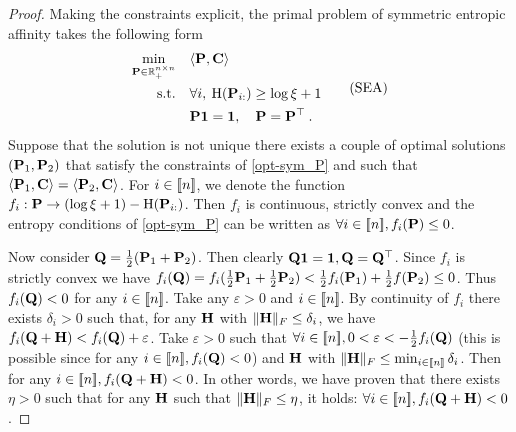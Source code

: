 \begin{proof}
Making the constraints explicit, the primal problem of symmetric entropic affinity takes the following form
\begin{equation}
\begin{aligned}
    \min_{\mathbf{P} \in \mathbb{R}_+^{n \times n}} \quad &\langle \mathbf{P}, \mathbf{C} \rangle \\
    \text{s.t.} \quad &\forall i, \: \operatorname{H}(\mathbf{P}_{i:}) \geq \log{\xi} + 1 \\
    & \mathbf{P} \bm{1} = \bm{1}, \quad \mathbf{P} = \mathbf{P}^\top \:.
\end{aligned}
\tag{SEA}\label{opt-sym_P}
\end{equation}
Suppose that the solution is not unique \ie there exists a couple of optimal solutions $(\mathbf{P}_1, \mathbf{P}_2)$ that satisfy the constraints of \eqref{opt-sym_P} and such that $\langle \mathbf{P}_1, \mathbf{C} \rangle=\langle \mathbf{P}_2, \mathbf{C} \rangle$. For $i \in {[\![n]\!]}$, we denote the function $f_{i}: \mathbf{P} \rightarrow (\log{\xi} + 1)-\operatorname{H}(\mathbf{P}_{i:})$. Then  $f_i$ is continuous, strictly convex and the entropy conditions of  \eqref{opt-sym_P} can be written as $\forall i \in {[\![n]\!]}, f_{i}(\mathbf{P}) \leq 0$. 

Now consider $\mathbf{Q} = \frac{1}{2} (\mathbf{P}_1 + \mathbf{P}_2)$. Then clearly $\mathbf{Q} \bm{1} = \bm{1}, \mathbf{Q} = \mathbf{Q}^\top$. Since $f_i$ is strictly convex we have $f_i(\mathbf{Q}) = f_i(\frac{1}{2}\mathbf{P}_1+\frac{1}{2}\mathbf{P}_2) < \frac{1}{2} f_i(\mathbf{P}_1) +\frac{1}{2} f(\mathbf{P}_2) \leq 0$. Thus $f_i(\mathbf{Q}) < 0$ for any $i \in {[\![n]\!]}$. Take any $\varepsilon >0$ and $i \in {[\![n]\!]}$. By continuity of $f_i$ there exists $\delta_i > 0$ such that, for any $\mathbf{H}$ with $\|\mathbf{H}\|_F \leq \delta_i$, we have $f_{i}(\mathbf{Q}+\mathbf{H}) < f_{i}(\mathbf{Q})+ \varepsilon$. Take $\varepsilon >0$ such that $\forall i \in {[\![n]\!]},  0 < \varepsilon < -\frac{1}{2} f_{i}(\mathbf{Q})$ (this is possible since for any $i \in {[\![n]\!]}, f_{i}(\mathbf{Q}) <0$) and $\mathbf{H}$ with $\|\mathbf{H}\|_F \leq \min_{i \in {[\![n]\!]}} \delta_i$. Then for any $i \in {[\![n]\!]}, f_{i}(\mathbf{Q}+\mathbf{H}) < 0$. In other words, we have proven that there exists $\eta > 0$ such that for any $\mathbf{H}$ such that $\|\mathbf{H}\|_F \leq \eta$, it holds: $\forall i \in {[\![n]\!]}, f_i(\mathbf{Q}+\mathbf{H}) < 0$.


\end{proof}
